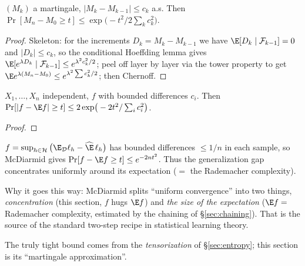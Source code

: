 
\begin{theorem}\label{thm:azuma}
$(M_k)$ a martingale, $|M_k-M_{k-1}|\le c_k$ a.s. Then $\Pr[M_n-M_0\ge t]\le \exp\!\big(-t^2/2\textstyle\sum_k c_k^2\big)$.
\end{theorem}
\begin{proof}
Skeleton: for the increments $D_k=M_k-M_{k-1}$ we have $\E[D_k\mid\mathcal F_{k-1}]=0$ and $|D_k|\le c_k$,
so the conditional Hoeffding lemma gives $\E[e^{\lambda D_k}\mid\mathcal F_{k-1}]\le e^{\lambda^2 c_k^2/2}$;
peel off layer by layer via the tower property to get $\E e^{\lambda(M_n-M_0)}\le e^{\lambda^2\sum c_k^2/2}$; then Chernoff.
\end{proof}

\begin{theorem}\label{thm:mcdiarmid}
$X_1,\dots,X_n$ independent, $f$ with bounded differences $c_i$. Then $\Pr[|f-\E f|\ge t]\le 2\exp\!\big(-2t^2/\textstyle\sum_i c_i^2\big)$.
\end{theorem}
\begin{proof}\end{proof}

\begin{example}\label{ex:generalization}
$f=\sup_{h\in\mathcal H}\big(\E_{\mathcal D}\ell_h-\widehat{\E}\,\ell_h\big)$ has bounded differences $\le 1/n$ in each sample,
so McDiarmid gives $\Pr[f-\E f\ge t]\le e^{-2nt^2}$. Thus the generalization gap concentrates uniformly around its
expectation ($=$ the Rademacher complexity). 
\end{example}

\begin{strand}
Why it goes this way: McDiarmid splits ``uniform convergence'' into two things, \emph{concentration}
(this section, $f$ hugs $\E f$) and \emph{the size of the expectation} ($\E f=$ Rademacher complexity, estimated
by the chaining of §\ref{sec:chaining}). That is the source of the standard two-step recipe in statistical learning theory.
\end{strand}

%
 The truly tight bound comes from the \emph{tensorization} of §\ref{sec:entropy}; this section is its ``martingale approximation''. 
